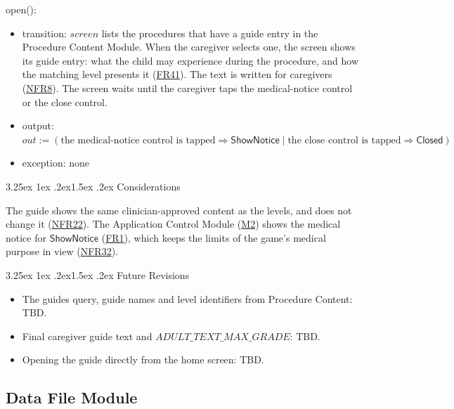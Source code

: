 \documentclass[10pt, titlepage]{article}
\makeatletter
\newcommand{\srsurl}{https://team-hindsight.github.io/ophthamology-game/SRS/SRS.pdf}
\newcommand{\srsitemref}[2]{\href{\srsurl\#nameddest=#1}{#2}}
\newcommand{\misref}[2]{\hyperref[mis:#1]{M#2}}
\renewcommand\paragraph{\@startsection{paragraph}{4}{\z@}%
  {3.25ex \@plus 1ex \@minus .2ex}{1.5ex \@plus .2ex}%
  {\normalfont\normalsize\bfseries}}
\newcommand{\T}[1]{\mathit{#1}}          %
\newcommand{\V}[1]{\mathsf{#1}}          %
\newcommand{\out}{\mathit{out}}
\makeatother
\begin{document}
\begin{samepage}
\noindent open():
\begin{itemize}
\item transition: $\T{screen}$ lists the procedures that have a guide entry
  in the Procedure Content Module. When the caregiver selects one, the screen
  shows its guide entry: what the child may experience during the procedure,
  and how the matching level presents it
  (\srsitemref{FR_ProcedureGuide}{FR41}). The text is written for caregivers
  (\srsitemref{NFR_Language}{NFR8}). The screen waits until the caregiver
  taps the medical-notice control or the close control.
\item output: $\out := (\text{the medical-notice control is tapped}
  \Rightarrow \V{ShowNotice} \mid \text{the close control is tapped}
  \Rightarrow \V{Closed})$
\item exception: none
\end{itemize}
\end{samepage}
\par\pagebreak[0]

\paragraph{Considerations}

The guide shows the same clinician-approved content as the levels, and does
not change it (\srsitemref{NFR_ClinicalAccuracy}{NFR22}). The Application
Control Module (\misref{Control}{2}) shows the medical notice for $\V{ShowNotice}$
(\srsitemref{FR_MedicalNotice}{FR1}), which keeps the limits of the game's
medical purpose in view (\srsitemref{NFR_NoClaims}{NFR32}).

\paragraph{Future Revisions}

\begin{itemize}
\item The guides query, guide names and level identifiers from Procedure Content: TBD.
\item Final caregiver guide text and $\T{ADULT\_TEXT\_MAX\_GRADE}$: TBD.
\item Opening the guide directly from the home screen: TBD.
\end{itemize}

\newpage
\subsection{Data File Module} \label{mis:DataFile}
\end{document}

